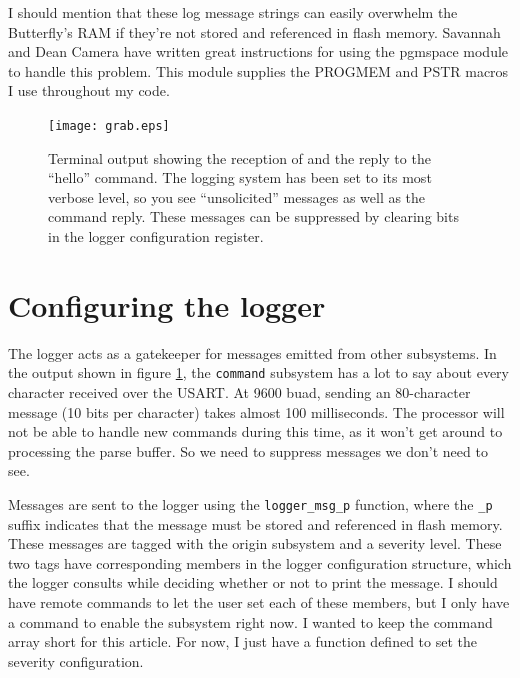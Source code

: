 I should mention that these log message strings can easily overwhelm the Butterfly's RAM if they're not stored and referenced in flash memory.  Savannah\cite{url:savannah:pgmspace} and Dean Camera\cite{url:deancamera:pgmspace} have written great instructions for using the pgmspace module to handle this problem.  This module supplies the PROGMEM and PSTR macros I use throughout my code.

\begin{figure}[ht]
    \begin{center}
        \texttt{[image: grab.eps]}
        \caption{Terminal output showing the reception of and the reply to the ``hello'' command.  The logging system has been set to its most verbose level, so you see ``unsolicited'' messages as well as the command reply.  These messages can be suppressed by clearing bits in the logger configuration register.\label{fig:termgrab}}
    \end{center}
\end{figure}

\clearpage{}
\section{Configuring the logger}
The logger acts as a gatekeeper for messages emitted from other subsystems.  In the output shown in figure \ref{fig:termgrab}, the \texttt{command} subsystem has a lot to say about every character received over the USART.  At 9600 buad, sending an 80-character message (10 bits per character) takes almost 100 milliseconds.  The processor will not be able to handle new commands during this time, as it won't get around to processing the parse buffer.  So we need to suppress messages we don't need to see.  

Messages are sent to the logger using the \texttt{logger\_msg\_p} function, where the \texttt{\_p} suffix indicates that the message must be stored and referenced in flash memory.  These messages are tagged with the origin subsystem and a severity level.  These two tags have corresponding members in the logger configuration structure, which the logger consults while deciding whether or not to print the message.  I should have remote commands to let the user set each of these members, but I only have a command to enable the subsystem right now.  I wanted to keep the command array short for this article.  For now, I just have a function defined to set the severity configuration.   

